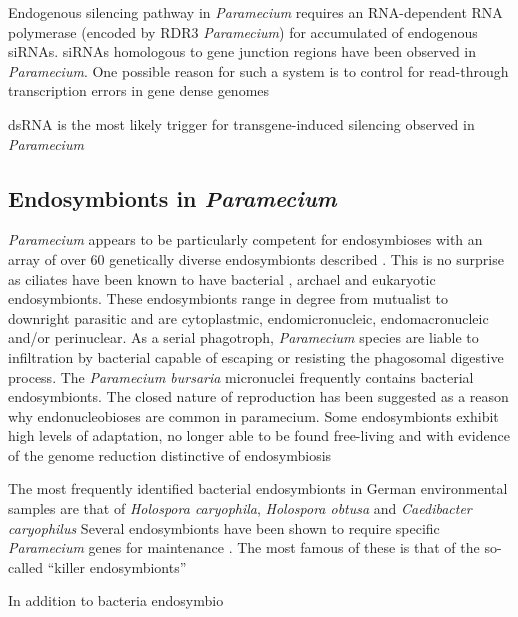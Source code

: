 Endogenous silencing pathway in \textit{Paramecium} requires an RNA-dependent RNA polymerase (encoded by RDR3 \textit{Paramecium}) for
accumulated of endogenous siRNAs.  siRNAs homologous to gene junction regions have been observed in \textit{Paramecium}. 
One possible reason for such a system is to control for read-through transcription errors in gene dense genomes \citep{Kiefer2013}

dsRNA is the most likely trigger for transgene-induced silencing observed in \textit{Paramecium}

\subsection{Endosymbionts in \textit{Paramecium}}
\textit{Paramecium} appears to be particularly competent for endosymbioses with an array of over 60 
genetically diverse endosymbionts described \citep{Gortz2009}. 
This is no surprise as ciliates have been known to have bacterial \citep{Gortz2009}, archael \citep{Wrede2012} and 
eukaryotic \citep{Kodama2009} endosymbionts.
These endosymbionts range in degree from mutualist to downright parasitic and are cytoplastmic, endomicronucleic,
endomacronucleic and/or perinuclear. 
As a serial phagotroph, \textit{Paramecium} species are liable to infiltration by bacterial capable of escaping or resisting
the phagosomal digestive process. %
The \textit{Paramecium bursaria} micronuclei frequently contains bacterial endosymbionts. The closed nature of reproduction
has been suggested as a reason why endonucleobioses are common in paramecium.  \citep{Gortz2009}
Some endosymbionts exhibit high levels of adaptation, no longer able to be found free-living and with evidence of the genome reduction
distinctive of endosymbiosis \citep{Gortz2009} %

The most frequently identified bacterial endosymbionts in German environmental samples are that of \textit{Holospora  caryophila},
\textit{Holospora obtusa} and \textit{Caedibacter caryophilus}
Several endosymbionts have been shown to require specific \textit{Paramecium} genes for maintenance \cite{Fujishima1985}.
The most famous of these is that of the so-called ``killer endosymbionts'' 

In addition to bacteria endosymbio
%

